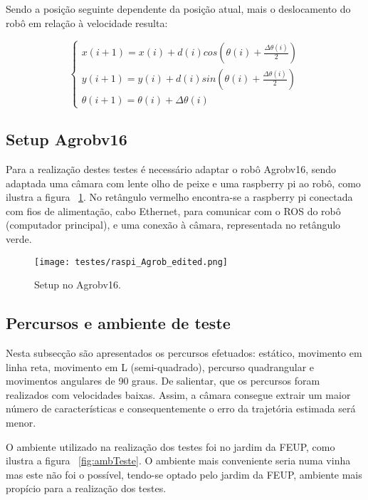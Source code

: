 Sendo a posição seguinte dependente da posição atual, mais o deslocamento do robô em relação à velocidade resulta:

\[ \left\{\begin{array}{ccc}
x(i+1) = x(i) + d(i) cos( \theta(i) + \frac{\Delta \theta(i)}{2})\\ 
y(i+1) = y(i) + d(i) sin( \theta(i) + \frac{\Delta \theta(i)}{2})\\ 
\theta (i+1) = \theta (i) + \Delta \theta (i)
\end{array}\right. \]



\subsection{Setup Agrobv16}


Para a realização destes testes é necessário adaptar o robô Agrobv16, sendo adaptada uma câmara com lente olho de peixe e uma raspberry pi ao robô, como ilustra a figura ~\ref{fig:adptPicam}. No retângulo vermelho encontra-se a raspberry pi conectada com fios de alimentação, cabo Ethernet, para comunicar com o ROS do robô (computador principal), e uma conexão à câmara, representada no retângulo verde.


\begin{figure}[h!] 
	\begin{center}
		\leavevmode		
		\texttt{[image: testes/raspi\_Agrob\_edited.png]}
		\caption{Setup no Agrobv16.}
		\label{fig:adptPicam}
	\end{center}
\end{figure}


\FloatBarrier
\subsection{Percursos e ambiente de teste}


Nesta subsecção são apresentados os percursos efetuados: estático, movimento em linha reta, movimento em L (semi-quadrado), percurso quadrangular e movimentos angulares de 90 graus. De salientar, que os percursos foram realizados com velocidades baixas. Assim, a câmara consegue extrair um maior número de características e consequentemente o erro da trajetória estimada será menor. 


O ambiente utilizado na realização dos testes foi no  jardim da FEUP, como ilustra a figura ~\ref{fig:ambTeste}. O ambiente mais conveniente seria numa vinha mas este não foi o possível, tendo-se optado pelo jardim da FEUP, ambiente mais propício para a realização dos testes. 


